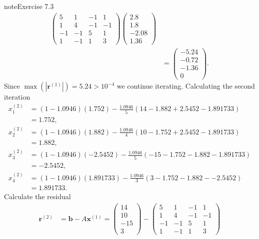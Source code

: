 \documentclass[letterpaper,10pt,english]{jupyterBook}
\begin{document}
\begin{sphinxadmonition}{note}{Exercise 7.3}
\begin{align*}
    \begin{pmatrix} 5 & 1 & -1 & 1 \\ 1 & 4 & -1 & -1 \\ -1 & -1 & 5 & 1 \\ 1 & -1 & 1 & 3 \end{pmatrix}
    \begin{pmatrix} 2.8 \\ 1.8 \\ -2.08 \\ 1.36 \end{pmatrix} \\
    &= \begin{pmatrix} -5.24 \\ -0.72 \\ -1.36 \\ 0\end{pmatrix}.
\end{align*}
\sphinxAtStartPar
Since \(\max(| \mathbf{r}^{(1)} |) = 5.24 > 10^{-4}\) we continue iterating. Calculating the second iteration
\begin{align*}
    x_{1}^{(2)} &= (1 - 1.0946)(1.752) - \frac{1.0946}{5} \left( 14 - 1.882 + 2.5452 - 1.891733 \right) \\ 
    &= 1.752, \\
    x_{2}^{(2)} &= (1 - 1.0946)(1.882) - \frac{1.0946}{4} \left( 10 - 1.752 + 2.5452 - 1.891733 \right) \\
    &= 1.882, \\
    x_{3}^{(2)} &= (1 - 1.0946)(-2.5452) - \frac{1.0946}{5} \left( -15 - 1.752 - 1.882 - 1.891733 \right) \\
    &= -2.5452, \\
    x_{4}^{(2)} &= (1 - 1.0946)(1.891733) - \frac{1.0946}{3} \left( 3 - 1.752 - 1.882 - -2.5452 \right) \\
    &= 1.891733.
\end{align*}
\sphinxAtStartPar
Calculate the residual
\begin{align*}
    \mathbf{r}^{(2)} &= \mathbf{b} - A \mathbf{x}^{(1)} = 
    \begin{pmatrix} 14 \\ 10 \\ -15 \\ 3 \end{pmatrix} -
    \begin{pmatrix} 5 & 1 & -1 & 1 \\ 1 & 4 & -1 & -1 \\ -1 & -1 & 5 & 1 \\ 1 & -1 & 1 & 3 \end{pmatrix}

\end{align*}
\end{sphinxadmonition}
\end{document}
